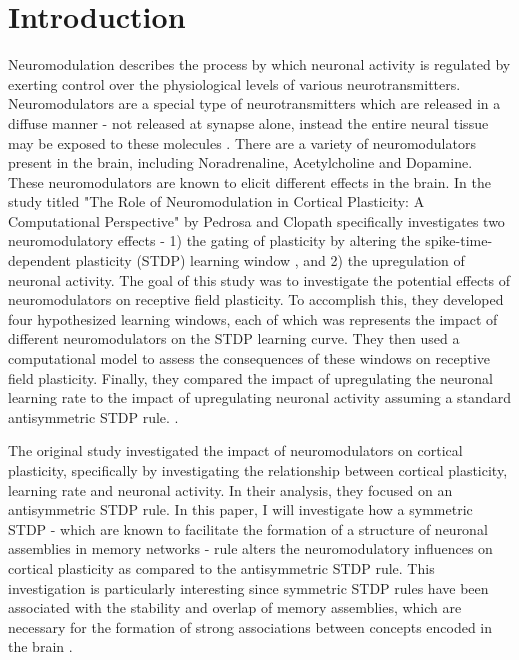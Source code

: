 \section{Introduction}

Neuromodulation describes the process by which neuronal activity is regulated by exerting control over the physiological levels of various neurotransmitters. Neuromodulators are a special type of neurotransmitters which are released in a diffuse manner - not released at synapse alone, instead the entire neural tissue may be exposed to these molecules \cite{WhatNeuromodulation2009}. There are a variety of neuromodulators present in the brain, including Noradrenaline, Acetylcholine and Dopamine. These neuromodulators are known to elicit different effects in the brain. In the study titled "The Role of Neuromodulation in Cortical Plasticity: A Computational Perspective" by Pedrosa and Clopath specifically investigates two neuromodulatory effects  - 1) the gating of plasticity by altering the spike-time-dependent plasticity (STDP) learning window \cite{pedrosaRoleNeuromodulatorsCortical2017}, and 2) the upregulation of neuronal activity. The goal of this study was to investigate the potential effects of neuromodulators on receptive field plasticity. To accomplish this, they developed four hypothesized learning windows, each of which was represents the impact of different neuromodulators on the STDP learning curve. They then used a computational model to assess the consequences of these windows on receptive field plasticity. Finally, they compared the impact of upregulating the neuronal learning rate to the impact of upregulating neuronal activity assuming a standard antisymmetric STDP rule. \cite{pedrosaRoleNeuromodulatorsCortical2017}.

The original study investigated the impact of neuromodulators on cortical plasticity, specifically by investigating the relationship between cortical plasticity, learning rate and neuronal activity. In their analysis, they focused on an antisymmetric STDP rule. In this paper, I will investigate how a symmetric STDP - which are known to facilitate the formation of a structure of neuronal assemblies in memory networks \cite{manzPurelySTDPbasedAssembly2023} -  rule alters the neuromodulatory influences on cortical plasticity as compared to the antisymmetric STDP rule. This investigation is particularly interesting since symmetric STDP rules have been associated with the stability and overlap of memory assemblies, which are necessary for the formation of strong associations between concepts encoded in the brain \cite{manzPurelySTDPbasedAssembly2023}.


